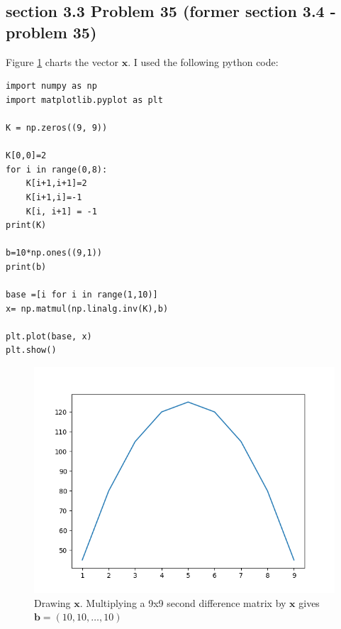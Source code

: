 \documentclass[a4paper,11pt]{article}
\newcommand{\mybf}[1]{\boldsymbol{#1}}
\begin{document}
\subsection*{section 3.3 Problem 35 (former section 3.4 - problem 35)}
Figure \ref{fig:kkk} charts the vector $\mybf{x}$.
I used the following python code:
\lstset{language=Python}
\lstset{frame=lines}
\lstset{basicstyle=\footnotesize}
\begin{lstlisting}
import numpy as np
import matplotlib.pyplot as plt

K = np.zeros((9, 9))

K[0,0]=2
for i in range(0,8):
    K[i+1,i+1]=2
    K[i+1,i]=-1
    K[i, i+1] = -1
print(K)

b=10*np.ones((9,1))
print(b)

base =[i for i in range(1,10)]
x= np.matmul(np.linalg.inv(K),b)

plt.plot(base, x)
plt.show()
\end{lstlisting}
\begin{figure}
  \includegraphics[width=\linewidth]{Figure_1.png}
  \caption{Drawing $\mybf{x}$. Multiplying a 9x9 second difference matrix by $\mybf{x}$ gives $\mybf{b} = (10, 10, \dots, 10)$ }
  \label{fig:kkk}
\end{figure}
\end{document}
